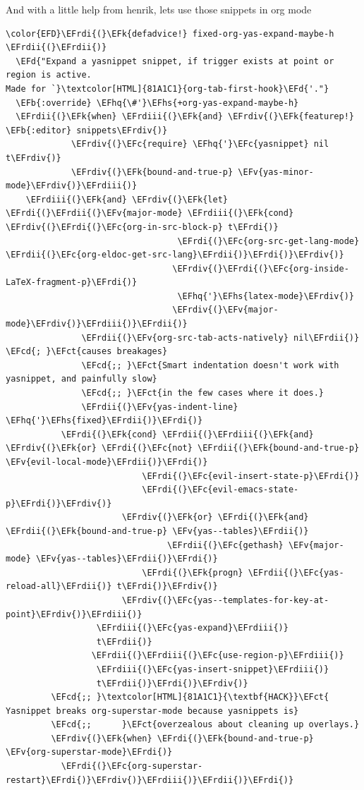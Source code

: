 \documentclass{scrartcl}
\newcommand{\EFk}[1]{\textcolor{EFk}{#1}} %
\newcommand{\EFd}[1]{\textcolor{EFd}{#1}} %
\newcommand{\EFb}[1]{\textcolor{EFb}{#1}} %
\newcommand{\EFct}[1]{\textcolor{EFct}{#1}} %
\newcommand{\EFc}[1]{\textcolor{EFc}{#1}} %
\newcommand{\EFv}[1]{\textcolor{EFv}{#1}} %
\newcommand{\EFcd}[1]{\textcolor{EFcd}{#1}} %
\newcommand{\EFhq}[1]{#1} %
\newcommand{\EFhs}[1]{#1} %
\newcommand{\EFrdi}[1]{#1} %
\newcommand{\EFrdii}[1]{#1} %
\newcommand{\EFrdiii}[1]{#1} %
\newcommand{\EFrdiv}[1]{#1} %
\begin{document}
And with a little help from henrik, lets use those snippets in org mode
\begin{Code}
\begin{Verbatim}[]
\color{EFD}\EFrdi{(}\EFk{defadvice!} fixed-org-yas-expand-maybe-h \EFrdii{(}\EFrdii{)}
  \EFd{"Expand a yasnippet snippet, if trigger exists at point or region is active.
Made for `}\textcolor[HTML]{81A1C1}{org-tab-first-hook}\EFd{'."}
  \EFb{:override} \EFhq{\#'}\EFhs{+org-yas-expand-maybe-h}
  \EFrdii{(}\EFk{when} \EFrdiii{(}\EFk{and} \EFrdiv{(}\EFk{featurep!} \EFb{:editor} snippets\EFrdiv{)}
             \EFrdiv{(}\EFc{require} \EFhq{'}\EFc{yasnippet} nil t\EFrdiv{)}
             \EFrdiv{(}\EFk{bound-and-true-p} \EFv{yas-minor-mode}\EFrdiv{)}\EFrdiii{)}
    \EFrdiii{(}\EFk{and} \EFrdiv{(}\EFk{let} \EFrdi{(}\EFrdii{(}\EFv{major-mode} \EFrdiii{(}\EFk{cond} \EFrdiv{(}\EFrdi{(}\EFc{org-in-src-block-p} t\EFrdi{)}
                                  \EFrdi{(}\EFc{org-src-get-lang-mode} \EFrdii{(}\EFc{org-eldoc-get-src-lang}\EFrdii{)}\EFrdi{)}\EFrdiv{)}
                                 \EFrdiv{(}\EFrdi{(}\EFc{org-inside-LaTeX-fragment-p}\EFrdi{)}
                                  \EFhq{'}\EFhs{latex-mode}\EFrdiv{)}
                                 \EFrdiv{(}\EFv{major-mode}\EFrdiv{)}\EFrdiii{)}\EFrdii{)}
               \EFrdii{(}\EFv{org-src-tab-acts-natively} nil\EFrdii{)} \EFcd{; }\EFct{causes breakages}
               \EFcd{;; }\EFct{Smart indentation doesn't work with yasnippet, and painfully slow}
               \EFcd{;; }\EFct{in the few cases where it does.}
               \EFrdii{(}\EFv{yas-indent-line} \EFhq{'}\EFhs{fixed}\EFrdii{)}\EFrdi{)}
           \EFrdi{(}\EFk{cond} \EFrdii{(}\EFrdiii{(}\EFk{and} \EFrdiv{(}\EFk{or} \EFrdi{(}\EFc{not} \EFrdii{(}\EFk{bound-and-true-p} \EFv{evil-local-mode}\EFrdii{)}\EFrdi{)}
                           \EFrdi{(}\EFc{evil-insert-state-p}\EFrdi{)}
                           \EFrdi{(}\EFc{evil-emacs-state-p}\EFrdi{)}\EFrdiv{)}
                       \EFrdiv{(}\EFk{or} \EFrdi{(}\EFk{and} \EFrdii{(}\EFk{bound-and-true-p} \EFv{yas--tables}\EFrdii{)}
                                \EFrdii{(}\EFc{gethash} \EFv{major-mode} \EFv{yas--tables}\EFrdii{)}\EFrdi{)}
                           \EFrdi{(}\EFk{progn} \EFrdii{(}\EFc{yas-reload-all}\EFrdii{)} t\EFrdi{)}\EFrdiv{)}
                       \EFrdiv{(}\EFc{yas--templates-for-key-at-point}\EFrdiv{)}\EFrdiii{)}
                  \EFrdiii{(}\EFc{yas-expand}\EFrdiii{)}
                  t\EFrdii{)}
                 \EFrdii{(}\EFrdiii{(}\EFc{use-region-p}\EFrdiii{)}
                  \EFrdiii{(}\EFc{yas-insert-snippet}\EFrdiii{)}
                  t\EFrdii{)}\EFrdi{)}\EFrdiv{)}
         \EFcd{;; }\textcolor[HTML]{81A1C1}{\textbf{HACK}}\EFct{ Yasnippet breaks org-superstar-mode because yasnippets is}
         \EFcd{;;      }\EFct{overzealous about cleaning up overlays.}
         \EFrdiv{(}\EFk{when} \EFrdi{(}\EFk{bound-and-true-p} \EFv{org-superstar-mode}\EFrdi{)}
           \EFrdi{(}\EFc{org-superstar-restart}\EFrdi{)}\EFrdiv{)}\EFrdiii{)}\EFrdii{)}\EFrdi{)}
\end{Verbatim}
\end{Code}
\end{document}
